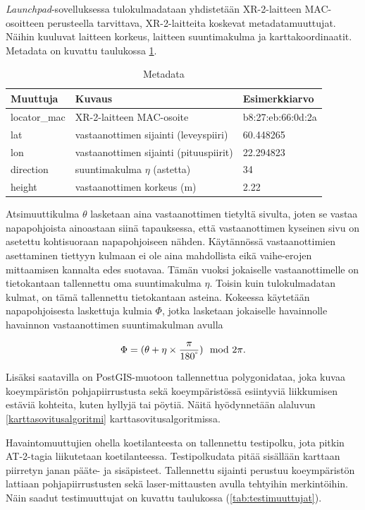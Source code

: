 \documentclass[
  12pt,
  a4paper, twoside]{book}
\begin{document}
\emph{Launchpad}-sovelluksessa tulokulmadataan yhdistetään XR-2-laitteen MAC-osoitteen perusteella tarvittava, XR-2-laitteita koskevat metadatamuuttujat. Näihin kuuluvat laitteen korkeus, laitteen suuntimakulma ja karttakoordinaatit. Metadata on kuvattu taulukossa \ref{tab:metadata}.

\def\arraystretch{1.25} 
\begin{table}[H]
\centering
\begin{tabular}{|l|l|l|}
\hline
Muuttuja & Kuvaus & Esimerkkiarvo\\
\hline
locator\_mac & XR-2-laitteen MAC-osoite & b8:27:eb:66:0d:2a\\
lat & vastaanottimen sijainti (leveyspiiri) & 60.448265\\
lon & vastaanottimen sijainti (pituuspiirit) & 22.294823\\
direction & suuntimakulma $\eta$ (astetta) & 34\\
height & vastaanottimen korkeus (m) & 2.22 \\
\hline
\end{tabular}
\caption{Metadata}
\label{tab:metadata}
\end{table}

Atsimuuttikulma \(\theta\) lasketaan aina vastaanottimen tietyltä sivulta, joten se vastaa napapohjoista ainoastaan siinä tapauksessa, että vastaanottimen kyseinen sivu on asetettu kohtisuoraan napapohjoiseen nähden. Käytännössä vastaanottimien asettaminen tiettyyn kulmaan ei ole aina mahdollista eikä vaihe-erojen mittaamisen kannalta edes suotavaa. Tämän vuoksi jokaiselle vastaanottimelle on tietokantaan tallennettu oma suuntimakulma \(\eta\). Toisin kuin tulokulmadatan kulmat, on tämä tallennettu tietokantaan asteina. Kokeessa käytetään napapohjoisesta laskettuja kulmia \(\Phi\), jotka lasketaan jokaiselle havainnolle havainnon vastaanottimen suuntimakulman avulla

\begin{align}
\Phi=(\theta + \eta \times \frac{\pi}{180^\degree}) \mod 2 \pi.
\end{align}

Lisäksi saatavilla on PostGIS-muotoon tallennettua polygonidataa, joka kuvaa koeympäristön pohjapiirrustusta sekä koeympäristössä esiintyviä liikkumisen estäviä kohteita, kuten hyllyjä tai pöytiä. Näitä hyödynnetään alaluvun \ref{karttasovitusalgoritmi} karttasovitusalgoritmissa.

Havaintomuuttujien ohella koetilanteesta on tallennettu testipolku, jota pitkin AT-2-tagia liikutetaan koetilanteessa. Testipolkudata pitää sisällään karttaan piirretyn janan pääte- ja sisäpisteet. Tallennettu sijainti perustuu koeympäristön lattiaan pohjapiirrustusten sekä laser-mittausten avulla tehtyihin merkintöihin. Näin saadut testimuuttujat on kuvattu taulukossa (\ref{tab:testimuuttujat}).
\end{document}
